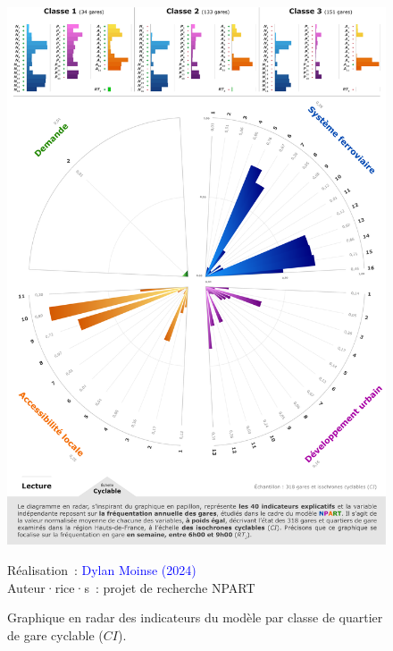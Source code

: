 \begin{refsegment}
    \begin{figure}[h!]\vspace*{4pt}
        \caption{Graphique en radar des indicateurs du modèle par classe de quartier de gare cyclable (\(CI\)).}
        \label{fig-chap6:radar-ci}
        \centerline{\includegraphics[width=1\columnwidth]{src/Figures/Chap-6/FR_NPART_Radar_CI.pdf}}
        \vspace{5pt}
        \begin{flushright}\scriptsize{
        Réalisation~: \textcolor{blue}{Dylan Moinse (2024)}
        \\
        Auteur·rice·s~: projet de recherche \acrshort{NPART}
        }\end{flushright}
    \end{figure}


\end{refsegment}
